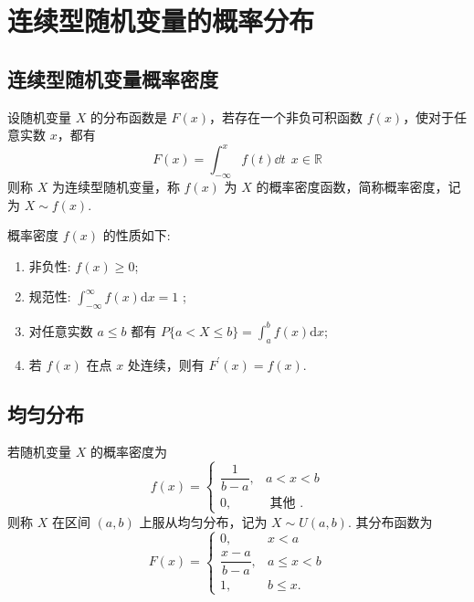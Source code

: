 \section{连续型随机变量的概率分布}

\subsection{连续型随机变量概率密度}

\begin{definition}[连续型随机变量概率密度]
    设随机变量 $ X $ 的分布函数是 $ F(x) $，若存在一个非负可积函数 $ f(x) $，使对于任意实数 $ x $，都有
    $$F(x)=\int_{-\infty}^{x} f(t) \dd t ~~x \in \mathbb{R}$$
    则称 $ X $ 为连续型随机变量，称 $ f(x) $ 为 $ X $ 的概率密度函数，简称概率密度，记为 $ X \sim f(x) .$
\end{definition}

\begin{theorem}[连续型随机变量概率密度的性质]
    概率密度 $ f(x) $ 的性质如下:
    \begin{enumerate}[label=(\arabic{*})]
        \item 非负性: $ f(x) \geqslant 0 $;
        \item 规范性: $ \displaystyle\int_{-\infty}^{\infty} f(x) \mathrm{d} x=1$ ;
        \item 对任意实数 $ a \leqslant b$ 都有 $\displaystyle P\{a<X \leqslant b\}=\int_{a}^{b} f(x) \mathrm{d} x $;
        \item 若 $ f(x) $ 在点 $ x $ 处连续，则有 $ F^{\prime}(x)=f(x) .$
    \end{enumerate}
\end{theorem}

\subsection{均匀分布}

\begin{definition}[均匀分布]
    若随机变量 $ X $ 的概率密度为
    $$f(x)=\begin{cases}
            \dfrac{1}{b-a}, & a<x<b           \\[6pt]
            0,              & \text { 其他 .}
        \end{cases}$$
    则称 $ X $ 在区间 $ (a, b)$ 上服从均匀分布，记为 $ X \sim U(a, b) $.
    其分布函数为
    $$F(x)=\begin{cases}
            0,                & x<a             \\
            \dfrac{x-a}{b-a}, & a \leqslant x<b \\[6pt]
            1,                & b \leqslant x.
        \end{cases}$$
\end{definition}

